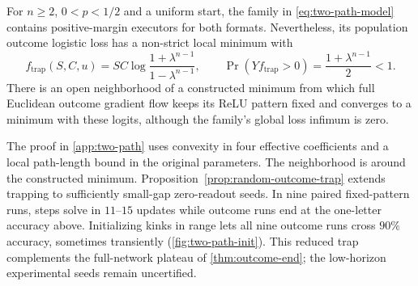 \begin{proposition}
\label{prop:two-path-trap}
For $n\ge2$, $0<p<1/2$ and a uniform start, the family in
\cref{eq:two-path-model} contains positive-margin executors for both formats.
Nevertheless, its population outcome logistic loss has a non-strict local minimum
with
\[
 f_{\mathrm{trap}}(S,C,u)=S C\log\frac{1+\lambda^{n-1}}{1-\lambda^{n-1}},
 \qquad \Pr(Yf_{\mathrm{trap}}>0)=\frac{1+\lambda^{n-1}}2<1.
\]
There is an open neighborhood of a constructed minimum from which full
Euclidean outcome gradient flow keeps its ReLU pattern fixed and converges
to a minimum with these logits, although the family's global loss infimum is zero.
\end{proposition}
The proof in \cref{app:two-path} uses convexity in four effective coefficients
and a local path-length bound in the original parameters. The neighborhood is
around the constructed minimum. Proposition~\ref{prop:random-outcome-trap}
extends trapping to sufficiently small-gap zero-readout seeds. In nine paired fixed-pattern runs, steps solve in $11$--$15$ updates while
outcome runs end at the one-letter accuracy above. Initializing kinks in range
lets all nine outcome runs cross $90\%$ accuracy, sometimes transiently
(\cref{fig:two-path-init}). This reduced trap complements the full-network plateau
of \cref{thm:outcome-end}; the low-horizon experimental seeds remain uncertified.

